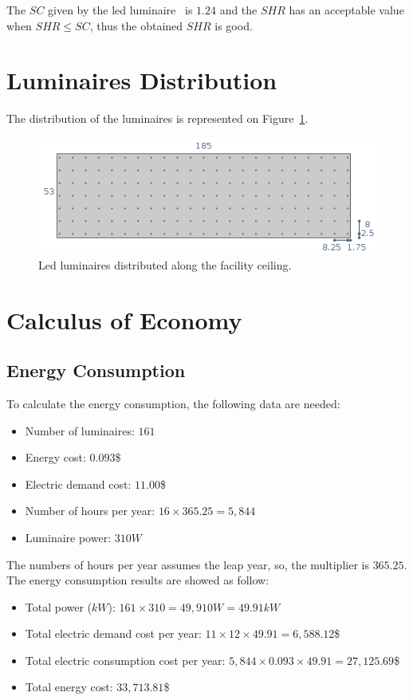 The $SC$ given by the led luminaire~\cite{www:led_photometric} is $1.24$ and the $SHR$ has an acceptable value when $SHR \leq SC$, thus the obtained $SHR$ is good.

\section{Luminaires Distribution}
The distribution of the luminaires is represented on Figure~\ref{fig:led_dist}.
\begin{figure}[h!]
\centering
\includegraphics[width=.9\textwidth]{./figs/led_dist.png}
\caption{Led luminaires distributed along the facility ceiling.}
\label{fig:led_dist}
\end{figure}


\section{Calculus of Economy}

\subsection{Energy Consumption}
To calculate the energy consumption, the following data are needed:
\begin{itemize}
\item Number of luminaires: $161$
\item Energy cost: $0.093$\$
\item Electric demand cost: $11.00$\$
\item Number of hours per year: $16 \times 365.25 = 5,844$
\item Luminaire power: $310 W$
\end{itemize}
The numbers of hours per year assumes the leap year, so, the multiplier is $365.25$. The energy consumption results are showed as follow:
\begin{itemize}
\item Total power ($kW$): $161 \times 310 = 49,910 W = 49.91 kW$
\item Total electric demand cost per year: $11 \times 12 \times 49.91 = 6,588.12$\$
\item Total electric consumption cost per year: $5,844 \times 0.093 \times 49.91 = 27,125.69$\$
\item Total energy cost: $33,713.81$\$
\end{itemize}

